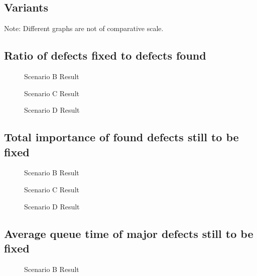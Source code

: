 \documentclass[a4paper,10pt]{article}
\begin{document}
\begin{appendices}
  \clearpage
  \section{Variants}
Note: Different graphs are not of comparative scale.
 
  
  \subsection{Ratio of defects fixed to defects found}
  \begin{figure}[!htb]
    \centering
    
    \caption{Scenario B Result}
  \end{figure}
  
  \begin{figure}[!htb]
    \centering
    
    \caption{Scenario C Result}
  \end{figure}
  
  \begin{figure}[!htb]
    \centering
    
    \caption{Scenario D Result}
  \end{figure}
  
  \clearpage
  \subsection{Total importance of found defects still to be fixed}
  \begin{figure}[!htb]
    \centering
    
    \caption{Scenario B Result}
  \end{figure}
  
  \begin{figure}[!htb]
    \centering
    
    \caption{Scenario C Result}
  \end{figure}
  
  \begin{figure}[!htb]
    \centering
    
    \caption{Scenario D Result}
  \end{figure}
 
  
  \clearpage
  \subsection{Average queue time of major defects still to be fixed}
  \begin{figure}[!htb]
    \centering
    
    \caption{Scenario B Result}
  \end{figure}
  

\end{appendices}
\end{document}
